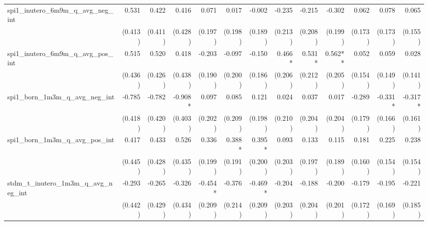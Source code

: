 \begin{tabular}{lrrrrrrrrrrrr}
spi1\_inutero\_6m9m\_q\_avg\_neg\_int       &        0.531 &        0.422 &        0.416 &        0.071 &        0.017 &       -0.002 &       -0.235 &       -0.215 &       -0.302 &        0.062 &        0.078 &        0.065 \\ 
                                            &      (0.413) &      (0.411) &      (0.428) &      (0.197) &      (0.198) &      (0.189) &      (0.213) &      (0.208) &      (0.199) &      (0.173) &      (0.173) &      (0.155) \\ 
spi1\_inutero\_6m9m\_q\_avg\_pos\_int       &        0.515 &        0.520 &        0.418 &       -0.203 &       -0.097 &       -0.150 &       0.466* &       0.531* &      0.562** &        0.052 &        0.059 &        0.028 \\ 
                                            &      (0.436) &      (0.426) &      (0.438) &      (0.190) &      (0.200) &      (0.186) &      (0.206) &      (0.212) &      (0.205) &      (0.154) &      (0.149) &      (0.141) \\ 
spi1\_born\_1m3m\_q\_avg\_neg\_int          &       -0.785 &       -0.782 &      -0.908* &        0.097 &        0.085 &        0.121 &        0.024 &        0.037 &        0.017 &       -0.289 &      -0.331* &      -0.317* \\ 
                                            &      (0.418) &      (0.420) &      (0.403) &      (0.202) &      (0.209) &      (0.198) &      (0.210) &      (0.204) &      (0.204) &      (0.179) &      (0.166) &      (0.161) \\ 
spi1\_born\_1m3m\_q\_avg\_pos\_int          &        0.417 &        0.433 &        0.526 &        0.336 &       0.388* &       0.395* &        0.093 &        0.133 &        0.115 &        0.181 &        0.225 &        0.238 \\ 
                                            &      (0.445) &      (0.428) &      (0.435) &      (0.199) &      (0.191) &      (0.200) &      (0.203) &      (0.197) &      (0.189) &      (0.160) &      (0.154) &      (0.154) \\ 
stdm\_t\_inutero\_1m3m\_q\_avg\_neg\_int    &       -0.293 &       -0.265 &       -0.326 &      -0.454* &       -0.376 &      -0.469* &       -0.204 &       -0.188 &       -0.200 &       -0.179 &       -0.195 &       -0.221 \\ 
                                            &      (0.442) &      (0.429) &      (0.434) &      (0.209) &      (0.214) &      (0.209) &      (0.203) &      (0.204) &      (0.201) &      (0.172) &      (0.169) &      (0.185) \\ 

\end{tabular}
